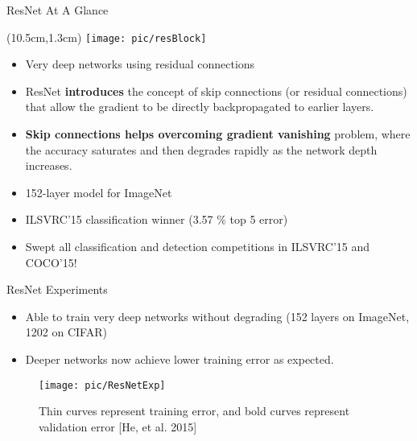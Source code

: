 \documentclass[serif, aspectratio=169]{beamer}
\begin{document}
\begin{frame}{ResNet At A Glance}
	
	\begin{textblock*}{5cm}(10.5cm,1.3cm) %
		\texttt{[image: pic/resBlock]}
	\end{textblock*}
	
	\begin{itemize}
		\item Very deep networks using residual connections
		\item ResNet \textbf{introduces} the concept of skip connections \newline (or residual connections) that allow the gradient to \newline be directly backpropagated to earlier layers.
		\item \textbf{Skip connections helps overcoming gradient vanishing} \newline problem, where the accuracy saturates and then \newline degrades rapidly as the network depth increases.
		\item 152-layer model for ImageNet
		\item ILSVRC’15 classification winner (3.57 \% top 5 error)
		\item Swept all classification and detection competitions \newline in ILSVRC’15 and COCO’15!
	\end{itemize}
\end{frame}

\begin{frame}{ResNet Experiments}
	\begin{itemize}
		\item Able to train very deep networks without degrading (152 layers on ImageNet, 1202 on CIFAR)
		\item Deeper networks now achieve lower training error as expected.
	\end{itemize}
	\begin{figure}[htpb]
		\begin{center}
			\texttt{[image: pic/ResNetExp]}
			\caption*{\scriptsize Thin curves represent training error, and bold curves represent validation error [He, et al. 2015]}
		\end{center}
	\end{figure}
\end{frame}
\end{document}
